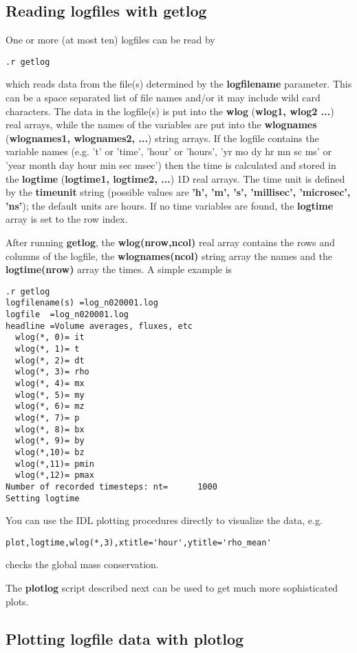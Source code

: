 \subsection{Reading logfiles with getlog \label{s-getlog}}

One or more (at most ten) logfiles can be read by
\begin{verbatim}
.r getlog
\end{verbatim}
which reads data from the file(s) determined by the {\bf logfilename} 
parameter. This can be a space separated list of file names and/or it
may include wild card characters. The data in the
logfile(s) is put into the {\bf wlog} ({\bf wlog1, wlog2 ...}) real arrays,
while the names of the variables are put into the {\bf wlognames} 
({\bf wlognames1, wlognames2, ...}) string arrays. If the logfile contains
the variable names (e.g. 't' or 'time', 'hour' or 'hours',
'yr mo dy hr mn sc ms' or 'year month day hour min sec msec') 
then the time is calculated and stored in the {\bf logtime} 
({\bf logtime1, logtime2, ...}) 1D real arrays. 
The time unit is defined by the {\bf timeunit} string
(possible values are {\bf 'h', 'm', 's', 'millisec', 'microsec', 'ns'});
the default units are hours. 
If no time variables are found, the {\bf logtime} array is set to the
row index.

After running {\bf getlog}, the {\bf wlog(nrow,ncol)} real array 
contains the rows and columns of the logfile, 
the {\bf wlognames(ncol)} string array the names and the
{\bf logtime(nrow)} array the times. A simple example is 
\begin{verbatim}
.r getlog
logfilename(s) =log_n020001.log
logfile  =log_n020001.log
headline =Volume averages, fluxes, etc
  wlog(*, 0)= it
  wlog(*, 1)= t
  wlog(*, 2)= dt
  wlog(*, 3)= rho
  wlog(*, 4)= mx
  wlog(*, 5)= my
  wlog(*, 6)= mz
  wlog(*, 7)= p
  wlog(*, 8)= bx
  wlog(*, 9)= by
  wlog(*,10)= bz
  wlog(*,11)= pmin
  wlog(*,12)= pmax
Number of recorded timesteps: nt=      1000
Setting logtime
\end{verbatim}
You can use the IDL plotting procedures directly to visualize the data, e.g.
\begin{verbatim}
plot,logtime,wlog(*,3),xtitle='hour',ytitle='rho_mean'
\end{verbatim}
checks the global mass conservation. 

The {\bf plotlog} script described next can be used to get 
much more sophisticated plots. 

\subsection{Plotting logfile data with plotlog \label{s-plotlog}}


